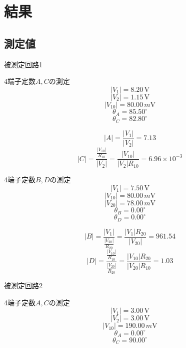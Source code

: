 
\section{結果}
\subsection*{測定値}
    \begin{description}
        \item 被測定回路1
        \begin{description}
            \item 4端子定数$A,C$の測定
            $$
            |V_1|=8.20\,\si{\volt}
            $$
            $$
            |V_2|=1.15\,\si{\volt}
            $$
            $$
            |V_{10}|=80.00\,\si{m\volt}
            $$
            $$
            \theta_A=85.50^\circ
            $$
            $$
            \theta_C=82.80^\circ
            $$

            $$
            |A|=\frac{\left|V_1\right|}{\left|V_2\right|}=7.13
            $$
            $$
            |C|=\frac{\frac{\left|V_{10}\right|}{R_{10}}}{\left|V_2\right|}=\frac{\left|V_{10}\right|}{\left|V_2\right| R_{10}}=6.96\times10^{-3}
            $$

            \item 4端子定数$B,D$の測定
            $$
            |V_1|=7.50\,\si{\volt}
            $$
            $$
            |V_{10}|=80.00\,\si{m\volt}
            $$
            $$
            |V_{20}|=78.00\,\si{m\volt}
            $$
            $$
            \theta_B=0.00^\circ
            $$
            $$
            \theta_D=0.00^\circ
            $$

            $$
            |B|=\frac{\left|V_1\right|}{\frac{\left|V_{20}\right|}{R_{20}}}=\frac{\left|V_1\right| R_{20}}{\left|V_{20}\right|}=961.54
            $$
            $$
            |D|=\frac{\frac{\left|V_{10}\right|}{R_{10}}}{\frac{\left|V_{20}\right|}{R_{20}}}=\frac{\left|V_{10}\right| R_{20}}{\left|V_{20}\right| R_{10}}=1.03
            $$

        \end{description}

        \newpage
        
        \item 被測定回路2
        \begin{description}
            \item 4端子定数$A,C$の測定
            $$
            |V_1|=3.00\,\si{\volt}
            $$
            $$
            |V_2|=3.00\,\si{\volt}
            $$
            $$
            |V_{10}|=190.00\,\si{m\volt}
            $$
            $$
            \theta_A=0.00^\circ
            $$
            $$
            \theta_C=90.00^\circ
            $$


\end{description}
\end{description}
